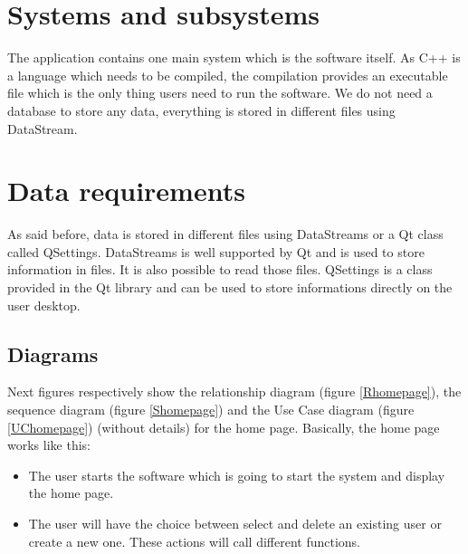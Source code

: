 \section{Systems and subsystems}
The application contains one main system which is the software itself. As C++ is a language which needs to be compiled, the compilation provides an executable file which is the only thing users need to run the software.
We do not need a database to store any data, everything is stored in different files using DataStream.  

\section{Data requirements}
As said before, data is stored in different files using DataStreams or a Qt class called QSettings. DataStreams is well supported by Qt and is used to store information in files. It is also possible to read those files. QSettings is a class provided in the Qt library and can be used to store informations directly on the user desktop.

\subsection{Diagrams}
Next figures respectively show the relationship diagram (figure \ref{Rhomepage}), the sequence diagram (figure \ref{Shomepage}) and the Use Case diagram (figure \ref{UChomepage}) (without details) for the home page. Basically, the home page works like this:
\begin{itemize}
\item The user starts the software which is going to start the system and display the home page.
\item The user will have the choice between select and delete an existing user or create a new one. These actions will call different functions.
\end{itemize}

